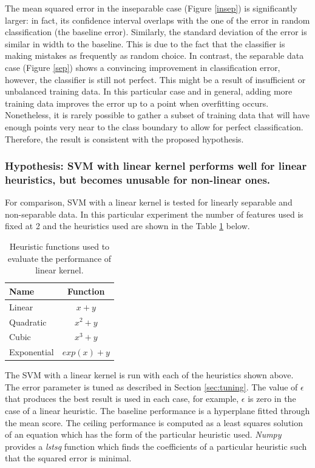 \documentclass[12pt,a4paper,notitlepage,twoside]{scrbook}
\begin{document}
The mean squared error in the inseparable case (Figure \ref{insep}) is significantly larger: in fact, its
confidence interval overlaps with the one of the error in random classification (the
baseline error). Similarly, the standard deviation of the error is similar in width to the
baseline. This is due to the fact that the classifier is making mistakes as frequently as random choice. In
contrast, the separable data case (Figure \ref{sep}) shows a convincing improvement in classification error,
however, the classifier is still not perfect. This might be a result of insufficient
or unbalanced training data. In this particular case and in general, adding more training
data improves the error up to a point when overfitting occurs. Nonetheless, it is rarely
possible to gather a subset of training data that will have enough points very near to the class
boundary to allow for perfect classification. Therefore, the result is consistent with the
proposed hypothesis.
\subsubsection*{Hypothesis: SVM with linear kernel performs well for linear heuristics, but becomes
unusable for non-linear ones.}


For comparison, SVM with a linear kernel is tested for linearly separable and
non-separable data. In this particular experiment the number of features used is fixed at
2 and the heuristics used are shown in the Table \ref{linkern} below. 

\begin{table}[h!]
	\centering
	\begin{tabular}[h!]{l|c}
		\hline
		Name & Function \\ \hline
		Linear & \(x+y\)\\ \hline
		Quadratic & \(x^2+y\)\\ \hline
		Cubic & \(x^3+y\)\\ \hline
		Exponential & \(exp(x)+y\)\\ \hline
	\end{tabular}
	\caption{Heuristic functions used to evaluate the performance of linear kernel.
		\label{linkern}}
\end{table}

The SVM with a linear kernel is run with each of the heuristics shown above. The error
parameter is tuned as described in Section \ref{sec:tuning}. The value of $\epsilon$ that produces
the best result is used in each case, for example, $\epsilon$ is zero in the
case of a linear heuristic. The baseline performance is a hyperplane fitted through the
mean score. The ceiling performance is computed as a least squares solution of an equation
which has the form of the particular heuristic used. \textit{Numpy} provides a
\textit{lstsq} function which finds the coefficients of a particular heuristic such that
the squared error is minimal.
\end{document}
